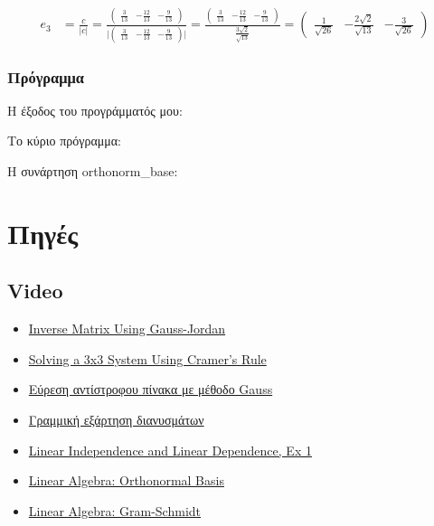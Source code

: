 \documentclass[12pt, fleqn, leqno]{extreport}
\begin{document}
\begin{equation}
    \begin{split}
        e_{3} &= \frac{c}{\vert c \vert} =
        \frac{
            \begin{pmatrix}
                \frac{3}{13} & -\frac{12}{13} & -\frac{9}{13}
            \end{pmatrix}
        }{
            \vert
            \begin{pmatrix}
                \frac{3}{13} & -\frac{12}{13} & -\frac{9}{13}
            \end{pmatrix}
            \vert
        } =
        \frac{
            \begin{pmatrix}
                \frac{3}{13} & -\frac{12}{13} & -\frac{9}{13}
            \end{pmatrix}
        }{
            \frac{3\sqrt{2}}{\sqrt{13}}
        } =
        \begin{pmatrix}
            \frac{1}{\sqrt{26}} & -\frac{2\sqrt{2}}{\sqrt{13}} & -\frac{3}{\sqrt{26}}
        \end{pmatrix}
    \end{split}
\end{equation}

\newpage
\subsection{Πρόγραμμα}

Η έξοδος του προγράμματός μου:


Το κύριο πρόγραμμα:


Η συνάρτηση orthonorm\_base:


\chapter{Πηγές}
\newpage

\section{Video}
\begin{itemize}
    \item \href{https://www.youtube.com/watch?v=cJg2AuSFdjw}{Inverse Matrix Using Gauss-Jordan}
    \item \href{https://youtu.be/X5rDjbp0t6s}{Solving a 3x3 System Using Cramer's Rule}
    \item \href{https://youtu.be/0vB1sgebS9c}{Εύρεση αντίστροφου πίνακα με μέθοδο Gauss}
    \item \href{https://youtu.be/Gmt1fmlrEto}{Γραμμική εξάρτηση διανυσμάτων}
    \item \href{https://youtu.be/yLi8RxqfowA}{Linear Independence and Linear Dependence, Ex 1}
    \item \href{https://www.youtube.com/watch?v=ZJu26chXEiw}{Linear Algebra: Orthonormal Basis}
    \item \href{https://www.youtube.com/watch?v=Aslf3KGq2UE}{Linear Algebra: Gram-Schmidt}
\end{itemize}
\end{document}
